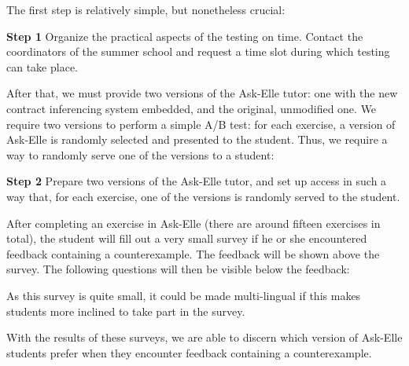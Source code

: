 \documentclass[10pt]{report}
\begin{document}
The first step is relatively simple, but nonetheless crucial:

\begin{description}
	\item{\textbf{Step 1}} Organize the practical aspects of the testing on time. Contact the coordinators of the summer school and request a time slot during which testing can take place.
\end{description}

After that, we must provide two versions of the Ask-Elle tutor: one with the new contract inferencing system embedded, and the original, unmodified one.
We require two versions to perform a simple A/B test: for each exercise, a version of Ask-Elle is randomly selected and presented to the student.
Thus, we require a way to randomly serve one of the versions to a student:

\begin{description}
	\item{\textbf{Step 2}} Prepare two versions of the Ask-Elle tutor, and set up access in such a way that, for each exercise, one of the versions is randomly served to the student.
\end{description}

After completing an exercise in Ask-Elle (there are around fifteen exercises in total), the student will fill out a very small survey if he or she encountered feedback containing a counterexample.
The feedback will be shown above the survey.
The following questions will then be visible below the feedback:


As this survey is quite small, it could be made multi-lingual if this makes students more inclined to take part in the survey.

With the results of these surveys, we are able to discern which version of Ask-Elle students prefer when they encounter feedback containing a counterexample.
\end{document}
